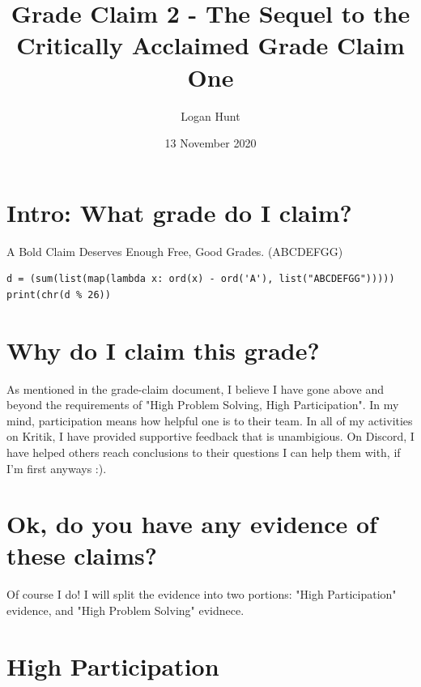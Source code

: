 \documentclass[11pt]{article}
\author{Logan Hunt}
\date{13 November 2020}
\title{Grade Claim 2 - The Sequel to the Critically Acclaimed Grade Claim One}
\begin{document}
\maketitle
\tableofcontents


\section{Intro: What grade do I claim?}
\label{sec:org4612e08}

A Bold Claim Deserves Enough Free, Good Grades. (ABCDEFGG)

\begin{verbatim}
d = (sum(list(map(lambda x: ord(x) - ord('A'), list("ABCDEFGG")))))
print(chr(d % 26))
\end{verbatim}

\section{Why do I claim this grade?}
\label{sec:org2b366b1}

As mentioned in the grade-claim document, I believe I have gone above and beyond the
requirements of "High Problem Solving, High Participation". In my mind, participation
means how helpful one is to their team. In all of my activities on Kritik, I have
provided supportive feedback that is unambigious. On Discord, I have helped others
reach conclusions to their questions I can help them with, if I'm first anyways :).

\section{Ok, do you have any evidence of these claims?}
\label{sec:org4d48796}

Of course I do! I will split the evidence into two portions: "High Participation" evidence,
and "High Problem Solving" evidnece.

\section{High Participation}
\label{sec:org4da0ac0}
\end{document}
